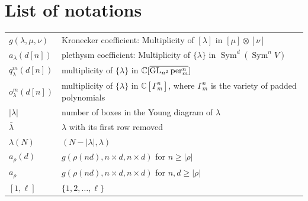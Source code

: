 \documentclass{article}
\numberwithin{equation}{section}
\theoremstyle{definition}
\def\la{\lambda}
\newcommand{\IC}{\mathbb C}
\DeclareMathOperator{\GL}{GL}
\DeclareMathOperator{\Sym}{Sym}
\newcommand{\per}{\textup{per}}
\begin{document}
\section*{List of notations}
\renewcommand{\arraystretch}{1.2}
\begin{tabular}{ll}
$g(\la,\mu,\nu)$ & Kronecker coefficient: Multiplicity of $[\la]$ in $[\mu]\otimes[\nu]$ \\
$a_\la(d[n])$ & plethysm coefficient: Multiplicity of $\{\la\}$ in $\Sym^d(\Sym^n V)$ \\
$q_\la^m(d[n])$ & multiplicity of $\{\la\}$ in $\IC[\overline{\GL_{n^2}\per_m^n}]$\\
$o_\la^m(d[n])$ & multiplicity of $\{\la\}$ in $\IC[\Gamma_m^n]$, where $\Gamma_m^n$ is the variety of padded polynomials\\
$|\la|$ & number of boxes in the Young diagram of $\la$\\
$\bar\la$ & $\la$ with its first row removed\\
$\la(N)$ & $(N-|\la|,\la)$\\
$a_\rho(d)$ & $g(\rho(nd),n\times d,n\times d)$ for $n \geq |\rho|$\\
$a_\rho$ & $g(\rho(nd),n\times d,n\times d)$ for $n,d \geq |\rho|$\\
$[1,\ell]$ & $\{1,2,\ldots,\ell\}$
\end{tabular}
\end{document}
